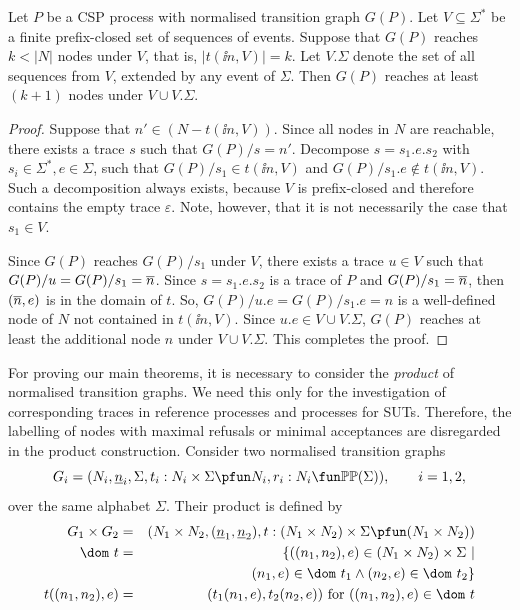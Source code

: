 \begin{lemma}
\label{lemma:extendV} Let $P$ be a CSP process with normalised transition
graph $G(P)$. %
Let
$V\subseteq\Sigma^*$ be a finite prefix-closed set of sequences of events.
Suppose that  $G(P)$ reaches $k < |N|$ nodes under $V$, that is, $|t(\ii
n,V)| = k$. Let $V.\Sigma$ denote the set of all sequences from $V$, extended
by any event of $\Sigma$. Then $G(P)$ reaches at least $(k+1)$ nodes under
$V\cup V.\Sigma$.
\end{lemma}
\begin{proof}
Suppose that $n'\in (N - t(\ii n,V))$.  Since all nodes in $N$ are reachable,
there exists a trace $s$ such that $G(P)/s = n'$. Decompose $s = s_1.e.s_2$
with $s_i\in\Sigma^*, e\in\Sigma$, such that $G(P)/s_1 \in t(\ii n,V)$ and
$G(P)/s_1.e \not\in t(\ii n,V)$. Such a decomposition always exists, because
$V$ is prefix-closed and therefore contains the empty trace $\varepsilon$.
Note, however, that it is not necessarily the case that $s_1\in V$.

Since $G(P)$ reaches $G(P)/s_1$ under $V$, there exists a trace $u\in V$ such
that $G(P)/u = G(P)/s_1 = \overline n$. Since $s = s_1.e.s_2$ is a trace of $P$ and
$G(P)/s_1 = \overline n$, then $(\overline n,e)$ is in the domain of $t$. So, $ G(P)/u.e
= G(P)/s_1.e = n$ is a well-defined node of $N$ not contained in $t(\ii
n,V)$. Since $u.e\in V\cup V.\Sigma$, $G(P)$ reaches at least the additional
node $n$ under $V\cup V.\Sigma$. This completes the proof. \xbox
\end{proof}

For proving our main theorems, it is necessary to consider the \emph{product}
of normalised transition graphs. We need this only for the investigation of
corresponding traces in reference processes and processes for SUTs.
Therefore, the labelling of nodes with maximal refusals or minimal
acceptances are disregarded in the product construction. Consider two
normalised transition graphs
\[
G_i = ( N_i, \ii n_i, \Sigma, t_i : N_i\times\Sigma \pfun N_i, r_i : N_i \fun \mathbb{P}\mathbb{P}(\Sigma)),\qquad i = 1,2,
\]
over the same alphabet $\Sigma$. Their product is defined by
\begin{eqnarray}
G_1\times G_2 & = & (N_1\times N_2,(\ii n_1,\ii n_2), t:(N_1\times N_2)\times\Sigma\pfun (N_1\times N_2))
\\
\dom~t & = & \{ ((n_1,n_2),e)\in (N_1\times N_2)\times\Sigma~|   \nonumber
\\ & & \tabc
(n_1,e)\in\dom~t_1\wedge
(n_2,e) \in\dom~t_2    \}
\\
t((n_1,n_2),e) & = & (t_1(n_1,e),t_2(n_2,e))\ \text{for $((n_1,n_2),e)\in\dom~t$}
\end{eqnarray}


